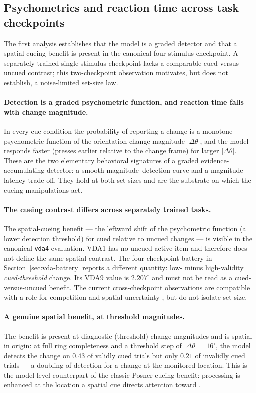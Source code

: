 \subsection{Psychometrics and reaction time across task checkpoints}
\label{sec:det-psych}

The first analysis establishes that the model is a graded detector and that a
spatial-cueing benefit is present in the canonical four-stimulus checkpoint. A
separately trained single-stimulus checkpoint lacks a comparable cued-versus-uncued
contrast; this two-checkpoint observation motivates, but does not establish, a
noise-limited set-size law.

\paragraph{Detection is a graded psychometric function, and reaction time falls
with change magnitude.}
In every cue condition the probability of reporting a change is a monotone
psychometric function of the orientation-change magnitude $|\Delta\theta|$, and the
model responds faster (presses earlier relative to the change frame) for larger
$|\Delta\theta|$. These are the two elementary behavioral signatures of a graded
evidence-accumulating detector: a smooth magnitude--detection curve and a
magnitude--latency trade-off. They hold at both set sizes and are the substrate on
which the cueing manipulations act.

\paragraph{The cueing contrast differs across separately trained tasks.}
The spatial-cueing benefit --- the leftward shift of the psychometric function (a
lower detection threshold) for cued relative to uncued changes --- is visible in
the canonical \texttt{vda4} evaluation. VDA1 has no uncued active item and therefore
does not define the same spatial contrast. The four-checkpoint battery in
Section~\ref{sec:vda-battery} reports a different quantity: low- minus high-validity
\emph{cued-threshold} change. Its VDA9 value is $2.207^\circ$ and must not be read as
a cued-versus-uncued benefit. The current cross-checkpoint observations are
compatible with a role for competition and spatial uncertainty
\cite{carrasco2011_visual_attention_25y}, but do not isolate set size.

\paragraph{A genuine spatial benefit, at threshold magnitudes.}
The benefit is present at diagnostic (threshold) change magnitudes and is spatial in
origin: at full ring completeness and a threshold step of $|\Delta\theta| =
16^\circ$, the model detects the change on $0.43$ of validly cued trials but only
$0.21$ of invalidly cued trials --- a doubling of detection for a change at the
monitored location. This is the model-level counterpart of the classic Posner
cueing benefit: processing is enhanced at the location a spatial cue directs
attention toward \cite{posner1980_orienting}.

